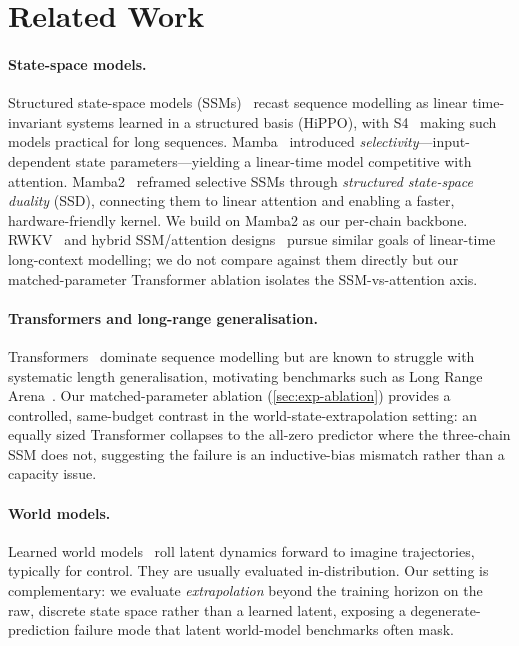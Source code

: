 \section{Related Work}
\label{sec:related}

\paragraph{State-space models.}
Structured state-space models (SSMs)~\cite{hippo,s4} recast sequence modelling
as linear time-invariant systems learned in a structured basis (HiPPO), with
S4~\cite{s4} making such models practical for long sequences. Mamba~\cite{mamba}
introduced \emph{selectivity}---input-dependent state parameters---yielding a
linear-time model competitive with attention. Mamba2~\cite{mamba2} reframed
selective SSMs through \emph{structured state-space duality} (SSD), connecting
them to linear attention and enabling a faster, hardware-friendly kernel. We
build on Mamba2 as our per-chain backbone. RWKV~\cite{rwkv} and
hybrid SSM/attention designs~\cite{poli2023strip} pursue similar goals of
linear-time long-context modelling; we do not compare against them directly but
our matched-parameter Transformer ablation isolates the SSM-vs-attention axis.

\paragraph{Transformers and long-range generalisation.}
Transformers~\cite{transformer} dominate sequence modelling but are known to
struggle with systematic length generalisation, motivating benchmarks such as
Long Range Arena~\cite{tay2020long}. Our matched-parameter ablation
(\cref{sec:exp-ablation}) provides a controlled, same-budget contrast in the
world-state-extrapolation setting: an equally sized Transformer collapses to
the all-zero predictor where the three-chain SSM does not, suggesting the
failure is an inductive-bias mismatch rather than a capacity issue.

\paragraph{World models.}
Learned world models~\cite{worldmodels,dreamer} roll latent dynamics forward to
imagine trajectories, typically for control. They are usually evaluated
in-distribution. Our setting is complementary: we evaluate \emph{extrapolation}
beyond the training horizon on the raw, discrete state space rather than a
learned latent, exposing a degenerate-prediction failure mode that latent
world-model benchmarks often mask.

